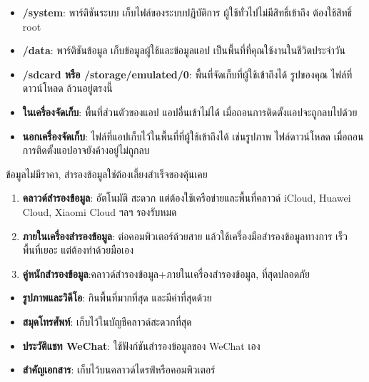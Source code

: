 
\begin{itemize}
  \item \textbf{/system}: พาร์ติชันระบบ เก็บไฟล์ของระบบปฏิบัติการ ผู้ใช้ทั่วไปไม่มีสิทธิ์เข้าถึง ต้องใช้สิทธิ์ root
  \item \textbf{/data}: พาร์ติชันข้อมูล เก็บข้อมูลผู้ใช้และข้อมูลแอป เป็นพื้นที่ที่คุณใช้งานในชีวิตประจำวัน
  \item \textbf{/sdcard หรือ /storage/emulated/0}: พื้นที่จัดเก็บที่ผู้ใช้เข้าถึงได้ รูปของคุณ ไฟล์ที่ดาวน์โหลด ล้วนอยู่ตรงนี้
\end{itemize}


\begin{itemize}
  \item \textbf{ในเครื่องจัดเก็บ}: พื้นที่ส่วนตัวของแอป แอปอื่นเข้าไม่ได้ เมื่อถอนการติดตั้งแอปจะถูกลบไปด้วย
  \item \textbf{นอกเครื่องจัดเก็บ}: ไฟล์ที่แอปเก็บไว้ในพื้นที่ที่ผู้ใช้เข้าถึงได้ เช่นรูปภาพ ไฟล์ดาวน์โหลด เมื่อถอนการติดตั้งแอปอาจยังค้างอยู่ไม่ถูกลบ
\end{itemize}


ข้อมูลไม่มีราคา, สำรองข้อมูลใช่ต้องเลี้ยงสำเร็จของคุ้นเคย


\begin{enumerate}
  \item \textbf{คลาวด์สำรองข้อมูล}: อัตโนมัติ สะดวก แต่ต้องใช้เครือข่ายและพื้นที่คลาวด์ iCloud, Huawei Cloud, Xiaomi Cloud ฯลฯ รองรับหมด
  \item \textbf{ภายในเครื่องสำรองข้อมูล}: ต่อคอมพิวเตอร์ด้วยสาย แล้วใช้เครื่องมือสำรองข้อมูลทางการ เร็ว พื้นที่เยอะ แต่ต้องทำด้วยมือเอง
  \item \textbf{คู่หนักสำรองข้อมูล}:คลาวด์สำรองข้อมูล+ภายในเครื่องสำรองข้อมูล, ที่สุดปลอดภัย
\end{enumerate}


\begin{itemize}
  \item \textbf{รูปภาพและวิดีโอ}: กินพื้นที่มากที่สุด และมีค่าที่สุดด้วย
  \item \textbf{สมุดโทรศัพท์}: เก็บไว้ในบัญชีคลาวด์สะดวกที่สุด
  \item \textbf{ประวัติแชท WeChat}: ใช้ฟังก์ชันสำรองข้อมูลของ WeChat เอง
  \item \textbf{สำคัญเอกสาร}: เก็บไว้บนคลาวด์ไดรฟ์หรือคอมพิวเตอร์
\end{itemize}

